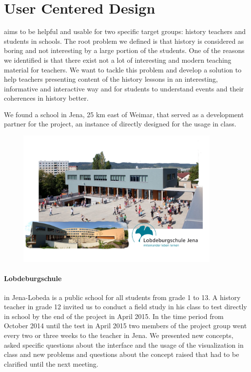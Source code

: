 \section{User Centered Design} %
\label{sec:user_centered_design}

\HG aims to be helpful and usable for two specific target groups: history teachers and students in schools. The root problem we defined is that history is considered as boring and not interesting by a large portion of the students. One of the reasons we identified is that there exist not a lot of interesting and modern teaching material for teachers. We want to tackle this problem and develop a solution to help teachers presenting content of the history lessons in an interesting, informative and interactive way and for students to understand events and their coherences in history better.

We found a school in Jena, 25 km east of Weimar, that served as a development partner for the project, an instance of \HG directly designed for the usage in class.

\begin{figure}[H]
  \centering
  \includegraphics[width=0.9\textwidth]{graphics/lobdeburgschule.jpg}
\end{figure}

\paragraph{Lobdeburgschule} in Jena-Lobeda is a public school for all students from grade 1 to 13. A history teacher in grade 12 invited us to conduct a field study in his class to test \HG directly in school by the end of the project in April 2015. In the time period from October 2014 until the test in April 2015 two members of the project group went every two or three weeks to the teacher in Jena. We presented new concepts, asked specific questions about the interface and the usage of the visualization in class and new problems and questions about the concept raised that had to be clarified until the next meeting.

